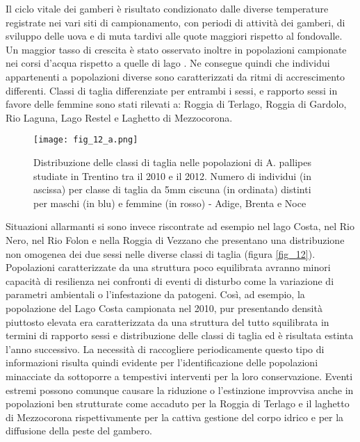 \documentclass[11pt,a4paper,italian,twoside,openany]{memoir}
\begin{document}
Il ciclo vitale dei gamberi è risultato condizionato dalle diverse temperature registrate nei vari siti di campionamento, con periodi di attività dei gamberi, di sviluppo delle uova e di muta tardivi alle quote maggiori rispetto al fondovalle. Un maggior tasso di crescita è stato osservato inoltre in popolazioni campionate nei corsi d'acqua rispetto a quelle di lago \cite{Endrizzi 2013}. Ne consegue quindi che individui appartenenti a popolazioni diverse sono caratterizzati da ritmi di accrescimento differenti. Classi di taglia differenziate per entrambi i sessi, e rapporto sessi in favore delle femmine sono stati rilevati a: Roggia di Terlago, Roggia di Gardolo, Rio Laguna, Lago Restel e Laghetto di Mezzocorona. 

\begin{figure}[!h]
  \centering
    \texttt{[image: fig\_12\_a.png]}
  \caption{Distribuzione delle classi di taglia nelle popolazioni di A. pallipes studiate in Trentino tra il 2010 e il 2012. Numero di individui (in ascissa) per classe di taglia da 5mm ciscuna (in ordinata) distinti per maschi (in blu) e femmine (in rosso) - Adige, Brenta e Noce}
  \label{fig_12_a}
\end{figure}

Situazioni allarmanti si sono invece riscontrate ad esempio nel lago Costa, nel Rio Nero, nel Rio Folon e nella Roggia di Vezzano che presentano una distribuzione non omogenea dei due sessi nelle diverse classi di taglia (figura \ref{fig_12}). Popolazioni caratterizzate da una struttura poco equilibrata avranno minori capacità di resilienza nei confronti di eventi di disturbo come la variazione di parametri ambientali o l'infestazione da patogeni. Così, ad esempio, la popolazione del Lago Costa campionata nel 2010, pur presentando densità piuttosto elevata era caratterizzata da una struttura del tutto squilibrata in termini di rapporto sessi e distribuzione delle classi di taglia ed è risultata estinta l'anno successivo. La necessità di raccogliere periodicamente questo tipo di informazioni risulta quindi evidente per l'identificazione delle popolazioni minacciate da sottoporre a tempestivi interventi per la loro conservazione. 
Eventi estremi possono comunque causare la riduzione o l'estinzione improvvisa anche in popolazioni ben strutturate come accaduto per la Roggia di Terlago e il laghetto di Mezzocorona rispettivamente per la cattiva gestione del corpo idrico e per la diffusione della peste del gambero. 
\end{document}
